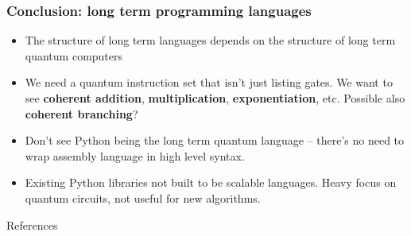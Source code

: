 \documentclass{beamer}
\begin{document}
\begin{frame}
\frametitle{Conclusion: long term programming languages}
\begin{itemize}
\item The structure of long term languages depends on the structure of long term quantum computers
\item We need a quantum instruction set that isn't just listing gates. We want to see \textbf{coherent addition}, \textbf{multiplication}, \textbf{exponentiation}, etc. Possible also \textbf{coherent branching}?
\item Don't see Python being the long term quantum language -- there's no need to wrap assembly language in high level syntax. 
\item Existing Python libraries not built to be scalable languages. Heavy focus on quantum circuits, not useful for new algorithms.
\end{itemize}
\end{frame}

\begin{frame}{References}


\end{frame}
\end{document}
